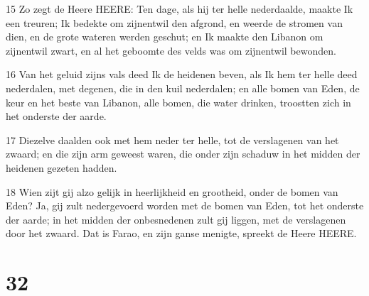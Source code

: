 \par 15 Zo zegt de Heere HEERE: Ten dage, als hij ter helle nederdaalde, maakte Ik een treuren; Ik bedekte om zijnentwil den afgrond, en weerde de stromen van dien, en de grote wateren werden geschut; en Ik maakte den Libanon om zijnentwil zwart, en al het geboomte des velds was om zijnentwil bewonden.
\par 16 Van het geluid zijns vals deed Ik de heidenen beven, als Ik hem ter helle deed nederdalen, met degenen, die in den kuil nederdalen; en alle bomen van Eden, de keur en het beste van Libanon, alle bomen, die water drinken, troostten zich in het onderste der aarde.
\par 17 Diezelve daalden ook met hem neder ter helle, tot de verslagenen van het zwaard; en die zijn arm geweest waren, die onder zijn schaduw in het midden der heidenen gezeten hadden.
\par 18 Wien zijt gij alzo gelijk in heerlijkheid en grootheid, onder de bomen van Eden? Ja, gij zult nedergevoerd worden met de bomen van Eden, tot het onderste der aarde; in het midden der onbesnedenen zult gij liggen, met de verslagenen door het zwaard. Dat is Farao, en zijn ganse menigte, spreekt de Heere HEERE.

\chapter{32}

